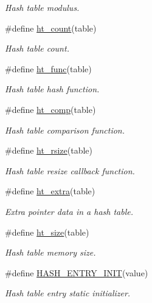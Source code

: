 \begin{CompactItemize}
\begin{CompactList}\small\item\em Hash table modulus. \item\end{CompactList}\item 
\#define \hyperlink{group__dbprim__hash_a23}{ht\_\-count}(table)
\begin{CompactList}\small\item\em Hash table count. \item\end{CompactList}\item 
\#define \hyperlink{group__dbprim__hash_a24}{ht\_\-func}(table)
\begin{CompactList}\small\item\em Hash table hash function. \item\end{CompactList}\item 
\#define \hyperlink{group__dbprim__hash_a25}{ht\_\-comp}(table)
\begin{CompactList}\small\item\em Hash table comparison function. \item\end{CompactList}\item 
\#define \hyperlink{group__dbprim__hash_a26}{ht\_\-rsize}(table)
\begin{CompactList}\small\item\em Hash table resize callback function. \item\end{CompactList}\item 
\#define \hyperlink{group__dbprim__hash_a27}{ht\_\-extra}(table)
\begin{CompactList}\small\item\em Extra pointer data in a hash table. \item\end{CompactList}\item 
\#define \hyperlink{group__dbprim__hash_a28}{ht\_\-size}(table)
\begin{CompactList}\small\item\em Hash table memory size. \item\end{CompactList}\item 
\#define \hyperlink{group__dbprim__hash_a29}{HASH\_\-ENTRY\_\-INIT}(value)
\begin{CompactList}\small\item\em Hash table entry static initializer. \item\end{CompactList}\item 

\end{CompactItemize}
